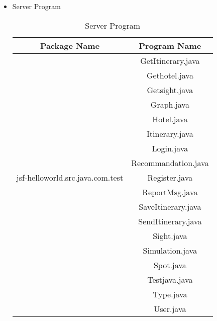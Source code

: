 \documentclass[10pt]{article}
\begin{document}
\begin{itemize}
\begin{table}[htb]
			\caption{Client Program Hierarchical Relation}\label{Client Program Hierarchical Relation}
		\end{table}

		\newpage
		\item[2.] Server Program
	 
		\begin{table}[htb]
			\centering
		
			\begin{tabular}{c|c} 
				\hline 
				Package Name&Program Name\\
				\hline
				&GetItinerary.java\\
				\cline{2-2}
				&Gethotel.java\\
				\cline{2-2}
				&Getsight.java\\
				\cline{2-2}
				&Graph.java\\
				\cline{2-2}
				&Hotel.java\\
				\cline{2-2}
				&Itinerary.java\\
				\cline{2-2}
				&Login.java\\
				\cline{2-2}
				&Recommandation.java\\
				\cline{2-2}
				jsf-helloworld.src.java.com.test&Register.java\\
				\cline{2-2}
				&ReportMsg.java\\
				\cline{2-2}
				&SaveItinerary.java\\
				\cline{2-2}
				&SendItinerary.java\\
				\cline{2-2}
				&Sight.java\\
				\cline{2-2}
				&Simulation.java\\
				\cline{2-2}
				&Spot.java\\
				\cline{2-2}
				&Testjava.java\\
				\cline{2-2}
				&Type.java\\
				\cline{2-2}
				&User.java\\
				\hline
		
			\end{tabular}   
					
			\caption{Server Program}\label{Server Program}
		\end{table}

\end{itemize}
\end{document}
